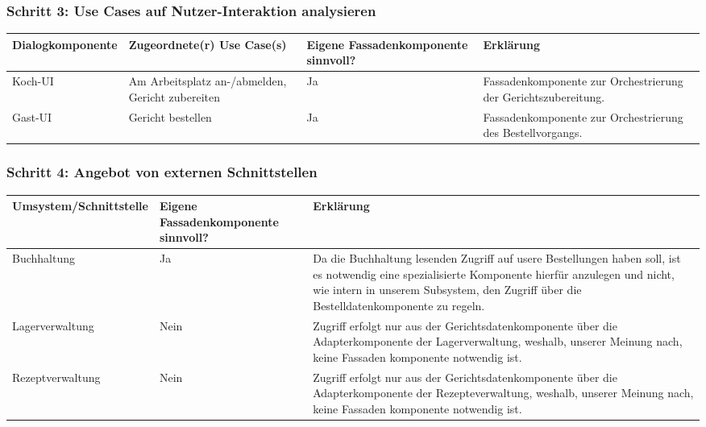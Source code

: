 
\subsubsection{Schritt 3: Use Cases auf Nutzer-Interaktion analysieren}

\begin{tabu} to \linewidth {X|X|X|X}
\hline
{}
Dialogkomponente &Zugeordnete(r) Use Case(s) &Eigene Fassadenkomponente sinnvoll?
  &Erkl\"arung \\
\hline
Koch-UI &Am Arbeitsplatz an-/abmelden, Gericht zubereiten &Ja &Fassadenkomponente zur
  Orchestrierung der Gerichtszubereitung. \\
\hline
Gast-UI &Gericht bestellen &Ja &Fassadenkomponente zur Orchestrierung des Bestellvorgangs. \\
\hline
\end{tabu}


\subsubsection{Schritt 4: Angebot von externen Schnittstellen}

\begin{tabu} to \linewidth {X|X|X}
\hline
{}
Umsystem/Schnittstelle &Eigene Fassadenkomponente sinnvoll? &Erkl\"arung \\
\hline
Buchhaltung &Ja &Da die Buchhaltung lesenden Zugriff auf
  usere Bestellungen haben soll, ist es notwendig eine spezialisierte Komponente
  hierf\"ur anzulegen und nicht, wie intern in unserem Subsystem, den Zugriff
  \"uber die Bestelldatenkomponente zu regeln.\\
\hline
Lagerverwaltung &Nein &Zugriff erfolgt nur aus der Gerichtsdatenkomponente \"uber die
  Adapterkomponente der Lagerverwaltung, weshalb, unserer Meinung nach, keine Fassaden\-
  komponente notwendig ist. \\
\hline
Rezeptverwaltung &Nein &Zugriff erfolgt nur aus der Gerichtsdatenkomponente \"uber die
  Adapterkomponente der Rezepteverwaltung, weshalb, unserer Meinung nach, keine Fassaden\-
  komponente notwendig ist. \\
\hline
\end{tabu}

